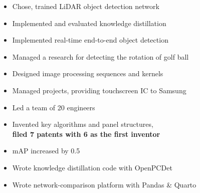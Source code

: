 \documentclass[10pt,a4paper,ragged2e,withhyper]{altacv}
\begin{document}
\begin{paracol}{2}

  \begin{itemize}
    \item Chose, trained LiDAR object detection network
    \item Implemented and evaluated knowledge distillation
    \item Implemented real-time end-to-end object detection
  \end{itemize}

  \divider

  \begin{itemize}
    \item Managed a research for detecting the rotation of golf ball
    \item Designed image processing sequences and kernels
  \end{itemize}

  \divider

  \begin{itemize}
    \item Managed projects, providing touchscreen IC to Samsung
    \item Led a team of 20 engineers
    \item Invented key algorithms and panel structures,\\
      \smallskip
      \textbf{\color{emphasis}filed 7 patents with 6 as the first inventor}
  \end{itemize}

\medskip


  \begin{itemize}
    \item mAP increased by 0.5
    \item Wrote knowledge distillation code with OpenPCDet
    \item Wrote network-comparison platform with Pandas \& Quarto
  \end{itemize}


\end{paracol}
\end{document}
